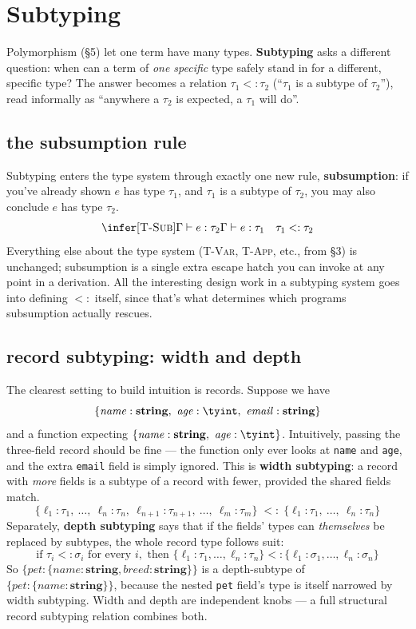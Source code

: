 \section{Subtyping}

Polymorphism (\S5) let one term have many types. \textbf{Subtyping} asks a different question: when can a term of \emph{one specific} type safely stand in for a different, specific type? The answer becomes a relation $\tau_1 <: \tau_2$ (``$\tau_1$ is a subtype of $\tau_2$''), read informally as ``anywhere a $\tau_2$ is expected, a $\tau_1$ will do''.

\subsection{the subsumption rule}

Subtyping enters the type system through exactly one new rule, \textbf{subsumption}: if you've already shown $e$ has type $\tau_1$, and $\tau_1$ is a subtype of $\tau_2$, you may also conclude $e$ has type $\tau_2$.
\[
\infer[\textsc{T-Sub}]
  {\Gamma \vdash e : \tau_2}
  {\Gamma \vdash e : \tau_1 \quad \tau_1 <: \tau_2}
\]
Everything else about the type system (\textsc{T-Var}, \textsc{T-App}, etc., from \S3) is unchanged; subsumption is a single extra escape hatch you can invoke at any point in a derivation. All the interesting design work in a subtyping system goes into defining $<:$ itself, since that's what determines which programs subsumption actually rescues.

\subsection{record subtyping: width and depth}

The clearest setting to build intuition is records. Suppose we have
\[
  \{\mathit{name}: \mathbf{string},\ \mathit{age}: \tyint,\ \mathit{email}: \mathbf{string}\}
\]
and a function expecting $\{\mathit{name}: \mathbf{string},\ \mathit{age}: \tyint\}$. Intuitively, passing the three-field record should be fine — the function only ever looks at \lstinline|name| and \lstinline|age|, and the extra \lstinline|email| field is simply ignored. This is \textbf{width subtyping}: a record with \emph{more} fields is a subtype of a record with fewer, provided the shared fields match.
\[
  \{\ell_1:\tau_1,\ \dots,\ \ell_n:\tau_n,\ \ell_{n+1}:\tau_{n+1},\ \dots,\ \ell_m:\tau_m\} \;<:\; \{\ell_1:\tau_1,\ \dots,\ \ell_n:\tau_n\}
\]
Separately, \textbf{depth subtyping} says that if the fields' types can \emph{themselves} be replaced by subtypes, the whole record type follows suit:
\[
  \text{if } \tau_i <: \sigma_i \text{ for every } i, \text{ then } \{\ell_1:\tau_1,\dots,\ell_n:\tau_n\} <: \{\ell_1:\sigma_1,\dots,\ell_n:\sigma_n\}
\]
So $\{\mathit{pet}: \{\mathit{name}:\mathbf{string}, \mathit{breed}:\mathbf{string}\}\}$ is a depth-subtype of $\{\mathit{pet}: \{\mathit{name}:\mathbf{string}\}\}$, because the nested \lstinline|pet| field's type is itself narrowed by width subtyping. Width and depth are independent knobs — a full structural record subtyping relation combines both.

